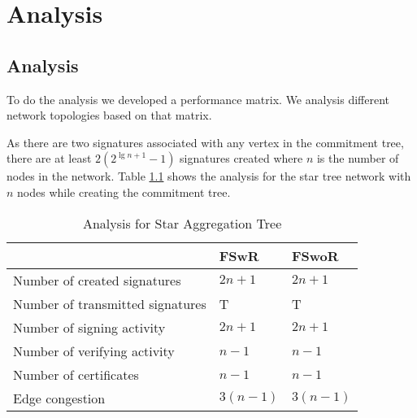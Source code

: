 \chapter{Analysis}

\section{Analysis}
	To do the analysis we developed a performance matrix. 
	We analysis different network topologies based on that matrix.

	As there are two signatures associated with any vertex in the commitment tree, there are at least $2 (2^{\lg n + 1} - 1)$ signatures created where $n$ is the number of nodes in the network.
	Table \ref{table:Analysis table for Star Aggregation Tree} shows the analysis for the star tree network with $n$ nodes while creating the commitment tree.
	\begin{table}[!htb]	
		\begin{center}
			\begin{tabular}{ |l| l| l| }
		    \hline
		    & FSwR & FSwoR \\
		    \hline
		    Number of created signatures & $2n + 1$ & $2n + 1$ \\	
		    \hline
		    Number of transmitted signatures & T & T\\
		    \hline
		    Number of signing activity & $2n + 1$ & $2n + 1$ \\
		    \hline
		    Number of verifying activity & $n - 1$ & $n - 1$ \\
		    \hline
		    Number of certificates & $n - 1$ & $n - 1$ \\
		    \hline
		    Edge congestion & $3(n - 1)$ & $3(n - 1)$\\
		    \hline
			\end{tabular}
		\end{center}
  	\caption{Analysis for Star Aggregation Tree}
	  \label{table:Analysis table for Star Aggregation Tree}
  \end{table}

